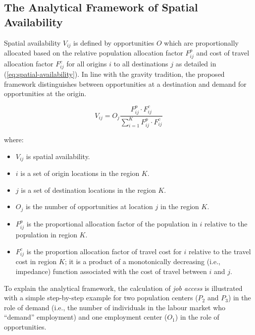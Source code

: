 \documentclass[]{elsarticle} %
\providecommand{\tightlist}{%
  \setlength{\itemsep}{0pt}\setlength{\parskip}{0pt}}
\begin{document}
\hypertarget{the-analytical-framework-of-spatial-availability}{%
\subsection{The Analytical Framework of Spatial
Availability}\label{the-analytical-framework-of-spatial-availability}}

Spatial availability \(V_{ij}\) is defined by opportunities \(O\) which
are proportionally allocated based on the relative population allocation
factor \(F^p_{ij}\) and cost of travel allocation factor \(F^c_{ij}\)
for all origins \(i\) to all destinations \(j\) as detailed in
(\ref{eq:spatial-availability}). In line with the gravity tradition, the
proposed framework distinguishes between opportunities at a destination
and demand for opportunities at the origin.

\begin{equation}
\label{eq:spatial-availability}
V_{ij} = O_j\frac{F^p_{ij} \cdot F^c_{ij}}{\sum_{i=1}^K F^p_{ij} \cdot F^c_{ij}}
\end{equation}

\noindent where:

\begin{itemize}
\tightlist
\item
  \(V_{ij}\) is spatial availability.
\item
  \(i\) is a set of origin locations in the region \(K\).
\item
  \(j\) is a set of destination locations in the region \(K\).
\item
  \(O_j\) is the number of opportunities at location \(j\) in the region
  \(K\).
\item
  \(F^p_{ij}\) is the proportional allocation factor of the population
  in \(i\) relative to the population in region \(K\).
\item
  \(F^c_{ij}\) is the proportion allocation factor of travel cost for
  \(i\) relative to the travel cost in region \(K\); it is a product of
  a monotonically decreasing (i.e., impedance) function associated with
  the cost of travel between \(i\) and \(j\).
\end{itemize}

To explain the analytical framework, the calculation of \emph{job
access} is illustrated with a simple step-by-step example for two
population centers (\(P_2\) and \(P_3\)) in the role of demand (i.e.,
the number of individuals in the labour market who ``demand''
employment) and one employment center (\(O_1\)) in the role of
opportunities.
\end{document}
